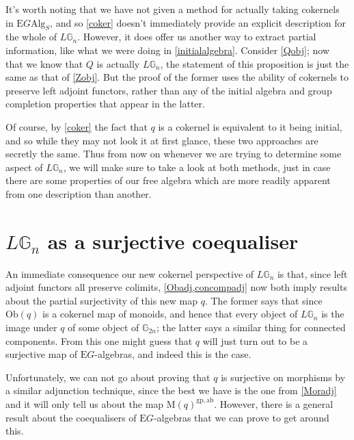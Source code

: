 It's worth noting that we have not given a method for actually taking cokernels in $\mathrm{E}G\mathrm{Alg}_S$, and so \cref{coker} doesn't immediately provide an explicit description for the whole of $L\mathbb{G}_n$. However, it does offer us another way to extract partial information, like what we were doing in \cref{initialalgebra}. Consider \cref{Qobj}; now that we know that $Q$ is actually $L\mathbb{G}_n$, the statement of this proposition is just the same as that of \cref{Zobj}. But the proof of the former uses the ability of cokernels to preserve left adjoint functors, rather than any of the initial algebra and group completion properties that appear in the latter.

Of course, by \cref{coker} the fact that $q$ is a cokernel is equivalent to it being initial, and so while they may not look it at first glance, these two approaches are secretly the same. Thus from now on whenever we are trying to determine some aspect of $L\mathbb{G}_n$, we will make sure to take a look at both methods, just in case there are some properties of our free algebra which are more readily apparent from one description than another.

\section{$L\mathbb{G}_n$ as a surjective coequaliser} \label{surjcoeq} 

An immediate consequence our new cokernel perspective of $L\mathbb{G}_n$ is that, since left adjoint functors all preserve colimits, \cref{Obadj,concompadj} now both imply results about the partial surjectivity of this new map $q$. The former says that since $\mathrm{Ob}(q)$ is a cokernel map of monoids, and hence that every object of $L\mathbb{G}_n$ is the image under $q$ of some object of $\mathbb{G}_{2n}$; the latter says a similar thing for connected components. From this one might guess that $q$ will just turn out to be a surjective map of $\mathrm{E}G$-algebras, and indeed this is the case.

Unfortunately, we can not go about proving that $q$ is surjective on morphisms by a similar adjunction technique, since the best we have is the one from \cref{Moradj} and it will only tell us about the map $\mathrm{M}(q)^{\mathrm{gp},\mathrm{ab}}$. However, there is a general result about the coequalisers of $\mathrm{E}G$-algebras that we can prove to get around this.


